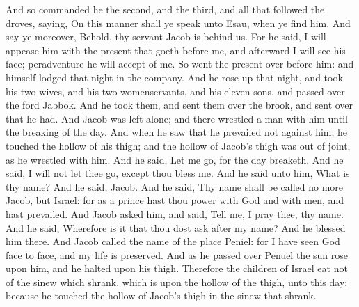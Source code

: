 \begin{biblechapter}
\verse And so commanded he the second, and the third, and all that followed the droves, saying, On this manner shall ye speak unto Esau, when ye find him.
\verse And say ye moreover, Behold, thy servant Jacob is behind us. For he said, I will appease him with the present that goeth before me, and afterward I will see his face; peradventure he will accept of me.
\verse So went the present over before him: and himself lodged that night in the company.
 And he rose up that night, and took his two wives, and his two womenservants, and his eleven sons, and passed over the ford Jabbok.
\verse And he took them, and sent them over the brook, and sent over that he had.
\verse And Jacob was left alone; and there wrestled a man with him until the breaking of the day.
\verse And when he saw that he prevailed not against him, he touched the hollow of his thigh; and the hollow of Jacob's thigh was out of joint, as he wrestled with him.
\verse And he said, Let me go, for the day breaketh. And he said, I will not let thee go, except thou bless me.
\verse And he said unto him, What is thy name? And he said, Jacob.
\verse And he said, Thy name shall be called no more Jacob, but Israel: for as a prince hast thou power with God and with men, and hast prevailed.
\verse And Jacob asked him, and said, Tell me, I pray thee, thy name. And he said, Wherefore is it that thou dost ask after my name? And he blessed him there.
\verse And Jacob called the name of the place Peniel: for I have seen God face to face, and my life is preserved.
\verse And as he passed over Penuel the sun rose upon him, and he halted upon his thigh.
\verse Therefore the children of Israel eat not of the sinew which shrank, which is upon the hollow of the thigh, unto this day: because he touched the hollow of Jacob's thigh in the sinew that shrank.
\end{biblechapter}


